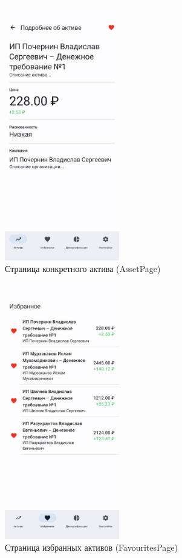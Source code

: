 \documentclass[a4paper, 14pt]{article}
\begin{document}
\begin{figure}[H]
    \centering
    \includegraphics[width=5cm]{resources/8.png}
    \caption{Страница конкретного актива (AssetPage)}
\end{figure}

\begin{figure}[H]
    \centering
    \includegraphics[width=5cm]{resources/9.png}
    \caption{Страница избранных активов (FavouritesPage)}
\end{figure}
\end{document}
